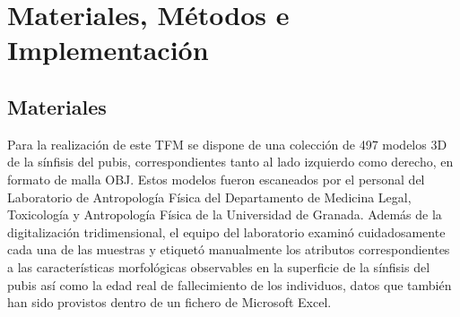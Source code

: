 \chapter{Materiales, Métodos e Implementación}

\section{Materiales}
Para la realización de este TFM se dispone de una colección de 497 modelos 3D de la sínfisis del pubis, correspondientes tanto al lado izquierdo como derecho, en formato de malla OBJ. Estos modelos fueron escaneados por el personal del Laboratorio de Antropología Física del Departamento de Medicina Legal, Toxicología y Antropología Física de la Universidad de Granada. Además de la digitalización tridimensional, el equipo del laboratorio examinó cuidadosamente cada una de las muestras y etiquetó manualmente los atributos correspondientes a las características morfológicas observables en la superficie de la sínfisis del pubis así como la edad real de fallecimiento de los individuos, datos que también han sido provistos dentro de un fichero de Microsoft Excel.

